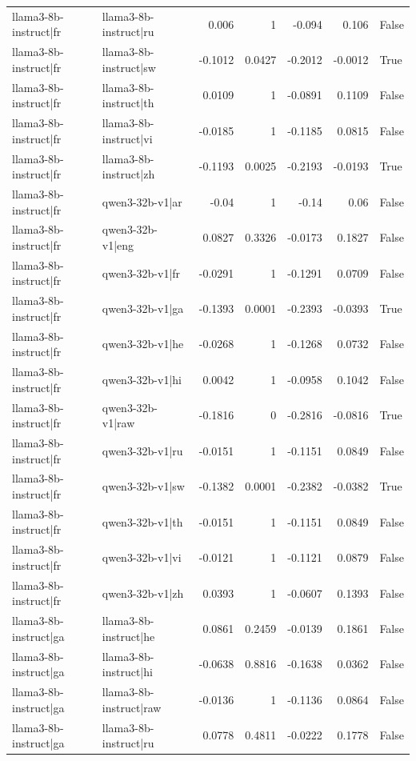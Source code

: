 \begin{table}
\begin{tabular}{l l r r r r l}
llama3-8b-instruct|fr & llama3-8b-instruct|ru & 0.006 & 1 & -0.094 & 0.106 & False \\
llama3-8b-instruct|fr & llama3-8b-instruct|sw & -0.1012 & 0.0427 & -0.2012 & -0.0012 & True \\
llama3-8b-instruct|fr & llama3-8b-instruct|th & 0.0109 & 1 & -0.0891 & 0.1109 & False \\
llama3-8b-instruct|fr & llama3-8b-instruct|vi & -0.0185 & 1 & -0.1185 & 0.0815 & False \\
llama3-8b-instruct|fr & llama3-8b-instruct|zh & -0.1193 & 0.0025 & -0.2193 & -0.0193 & True \\
llama3-8b-instruct|fr & qwen3-32b-v1|ar & -0.04 & 1 & -0.14 & 0.06 & False \\
llama3-8b-instruct|fr & qwen3-32b-v1|eng & 0.0827 & 0.3326 & -0.0173 & 0.1827 & False \\
llama3-8b-instruct|fr & qwen3-32b-v1|fr & -0.0291 & 1 & -0.1291 & 0.0709 & False \\
llama3-8b-instruct|fr & qwen3-32b-v1|ga & -0.1393 & 0.0001 & -0.2393 & -0.0393 & True \\
llama3-8b-instruct|fr & qwen3-32b-v1|he & -0.0268 & 1 & -0.1268 & 0.0732 & False \\
llama3-8b-instruct|fr & qwen3-32b-v1|hi & 0.0042 & 1 & -0.0958 & 0.1042 & False \\
llama3-8b-instruct|fr & qwen3-32b-v1|raw & -0.1816 & 0 & -0.2816 & -0.0816 & True \\
llama3-8b-instruct|fr & qwen3-32b-v1|ru & -0.0151 & 1 & -0.1151 & 0.0849 & False \\
llama3-8b-instruct|fr & qwen3-32b-v1|sw & -0.1382 & 0.0001 & -0.2382 & -0.0382 & True \\
llama3-8b-instruct|fr & qwen3-32b-v1|th & -0.0151 & 1 & -0.1151 & 0.0849 & False \\
llama3-8b-instruct|fr & qwen3-32b-v1|vi & -0.0121 & 1 & -0.1121 & 0.0879 & False \\
llama3-8b-instruct|fr & qwen3-32b-v1|zh & 0.0393 & 1 & -0.0607 & 0.1393 & False \\
llama3-8b-instruct|ga & llama3-8b-instruct|he & 0.0861 & 0.2459 & -0.0139 & 0.1861 & False \\
llama3-8b-instruct|ga & llama3-8b-instruct|hi & -0.0638 & 0.8816 & -0.1638 & 0.0362 & False \\
llama3-8b-instruct|ga & llama3-8b-instruct|raw & -0.0136 & 1 & -0.1136 & 0.0864 & False \\
llama3-8b-instruct|ga & llama3-8b-instruct|ru & 0.0778 & 0.4811 & -0.0222 & 0.1778 & False \\

\end{tabular}
\end{table}
